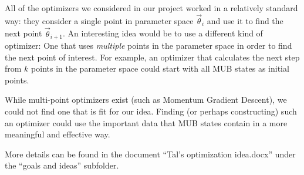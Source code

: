 \documentclass[a4paper,12pt]{article}
\newcommand{\thetas}{\vec{\theta}}
\begin{document}
All of the optimizers we considered in our project worked in a relatively standard way: they consider a single point in parameter space $\thetas_i$ and use it to find the next point $\thetas_{i+1}$. An interesting idea would be to use a different kind of optimizer: One that uses \emph{multiple} points in the parameter space in order to find the next point of interest. For example, an optimizer that calculates the next step from $k$ points in the parameter space could start with all MUB states as initial points.

While multi-point optimizers exist (such as Momentum Gradient Descent), we could not find one that is fit for our idea.
Finding (or perhaps constructing) such an optimizer could use the important data that MUB states contain in a more meaningful and effective way.


More details can be found in the document ``Tal's optimization idea.docx'' under the ``goals and ideas'' subfolder.



\printbibliography
\end{document}
